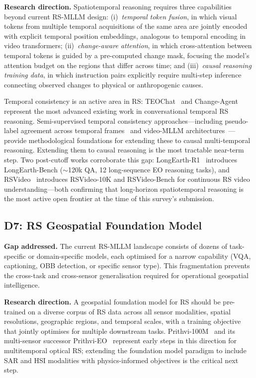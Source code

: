 \textbf{Research direction.} Spatiotemporal reasoning requires three
capabilities beyond current RS-MLLM design: (i)~\emph{temporal token
fusion}, in which visual tokens from multiple temporal acquisitions
of the same area are jointly encoded with explicit temporal position
embeddings, analogous to temporal encoding in video transformers;
(ii)~\emph{change-aware attention}, in which cross-attention between
temporal tokens is guided by a pre-computed change mask, focusing the
model's attention budget on the regions that differ across time; and
(iii)~\emph{causal reasoning training data}, in which instruction pairs
explicitly require multi-step inference connecting observed changes to
physical or anthropogenic causes.

Temporal consistency is an active area in RS: TEOChat~\cite{teochat2025}
and Change-Agent~\cite{changeagent2025} represent the most advanced existing
work in conversational temporal RS reasoning. Semi-supervised temporal
consistency approaches---including pseudo-label agreement across temporal
frames~\cite{sm2lf2026} and video-MLLM architectures~\cite{llava_onevision2024}---provide
methodological foundations for extending these to causal multi-temporal
reasoning. Extending them to causal reasoning is the most tractable near-term step.
Two post-cutoff works corroborate this gap: LongEarth-R1~\cite{longearth_r1_2026}
introduces LongEarth-Bench ($\sim$120k QA, 12 long-sequence EO reasoning tasks),
and RSVideo~\cite{rsvideo_2026} introduces RSVideo-10K and RSVideo-Bench for
continuous RS video understanding---both confirming that long-horizon spatiotemporal
reasoning is the most active open frontier at the time of this survey's submission.

\subsection{D7: RS Geospatial Foundation Model}\label{sec9:d7}

\textbf{Gap addressed.} The current RS-MLLM landscape consists of
dozens of task-specific or domain-specific models, each optimised for
a narrow capability (VQA, captioning, OBB detection, or specific sensor
type). This fragmentation prevents the cross-task and cross-sensor
generalisation required for operational geospatial intelligence.

\textbf{Research direction.} A geospatial foundation model for RS
should be pre-trained on a diverse corpus of RS data across all sensor
modalities, spatial resolutions, geographic regions, and temporal
scales, with a training objective that jointly optimises for multiple
downstream tasks. Prithvi-100M~\cite{prithvi2023} and its multi-sensor
successor Prithvi-EO~\cite{geofm2024} represent early steps in this direction for
multitemporal optical RS; extending the foundation model paradigm to include SAR
and HSI modalities with physics-informed objectives is the critical next step.

